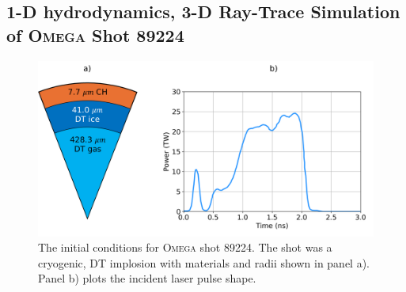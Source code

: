 \subsection{1-D hydrodynamics, 3-D Ray-Trace Simulation of \textsc{Omega} Shot 89224}%
\label{sec:SOLAS_89224}

\begin{figure}[t!]
    \includegraphics[width=0.9\linewidth]{Numerics/Images/89224_setup.png}
    \centering
    \caption{The initial conditions for \textsc{Omega} shot 89224.
    The shot was a cryogenic, DT implosion with materials and radii shown in panel a).
    Panel b) plots the incident laser pulse shape.}%
    \label{fig:89224_ICs}
\end{figure}

